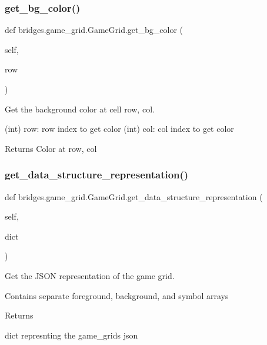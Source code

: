 \subsubsection{\texorpdfstring{get\+\_\+bg\+\_\+color()}{get\_bg\_color()}}
{\footnotesize\ttfamily def bridges.\+game\+\_\+grid.\+Game\+Grid.\+get\+\_\+bg\+\_\+color (\begin{DoxyParamCaption}\item[{}]{self,  }\item[{}]{row }\end{DoxyParamCaption})}



Get the background color at cell row, col. 

(int) row\+: row index to get color (int) col\+: col index to get color \begin{DoxyReturn}{Returns}
Color at row, col 
\end{DoxyReturn}
\mbox{\label{classbridges_1_1game__grid_1_1_game_grid_acb17afe074d5222b418e922ed5f48ed7}} 
\subsubsection{\texorpdfstring{get\+\_\+data\+\_\+structure\+\_\+representation()}{get\_data\_structure\_representation()}}
{\footnotesize\ttfamily def bridges.\+game\+\_\+grid.\+Game\+Grid.\+get\+\_\+data\+\_\+structure\+\_\+representation (\begin{DoxyParamCaption}\item[{}]{self,  }\item[{}]{dict }\end{DoxyParamCaption})}



Get the J\+S\+ON representation of the game grid. 

Contains separate foreground, background, and symbol arrays \begin{DoxyReturn}{Returns}


dict represnting the game\+\_\+grids json 
\end{DoxyReturn}
\mbox{\label{classbridges_1_1game__grid_1_1_game_grid_a0a38f422a54e93cfd2816e0051fb8d5a}} 
